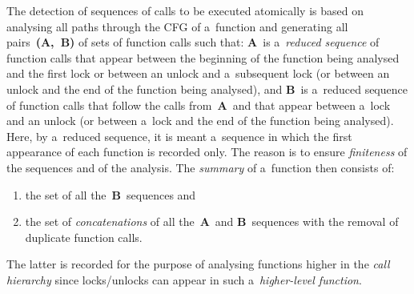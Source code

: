 The detection of sequences of calls to be executed atomically is based on
analysing all paths through the CFG of a~function and generating all
pairs~\textbf{(A,~B)} of sets of function calls such that: \textbf{A}~is
a~\emph{reduced sequence} of function calls that appear between the
beginning of the function being analysed and the first lock or between an
unlock and a~subsequent lock (or between an unlock and the end of the function
being analysed), and \textbf{B}~is a~reduced sequence of function calls that
follow the calls from~\textbf{A}~and that appear between a~lock and an unlock
(or between a~lock and the end of the function being analysed). Here, by
a~reduced sequence, it is meant a~sequence in which the first appearance
of each function is recorded only. The reason is to ensure \emph{finiteness}
of the sequences and of the analysis. The \emph{summary} of a~function
then consists of:
\begin{enumerate}[label={(\roman*)}]
    \item
        the set of all the~\textbf{B}~sequences and

    \item
        the set of \emph{concatenations} of all
        the~\textbf{A}~and \textbf{B}~sequences with the removal of
        duplicate function calls.
\end{enumerate}
The latter is recorded for the purpose of analysing functions higher in the
\emph{call hierarchy} since locks/unlocks can appear in such
a~\emph{higher-level function}.

